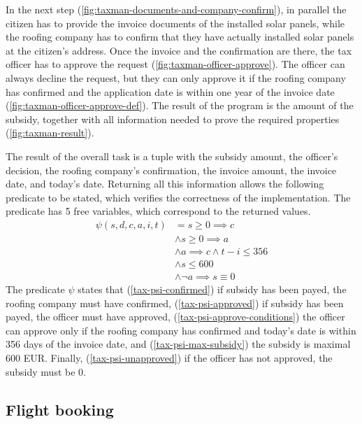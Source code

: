 In the next step (\cref{fig:taxman-documents-and-company-confirm}), in parallel the citizen has to provide the invoice documents of the installed solar panels, while the roofing company has to confirm that they have actually installed solar panels at the citizen's address.
Once the invoice and the confirmation are there, the tax officer has to approve the request (\cref{fig:taxman-officer-approve}).
The officer can always decline the request, but they can only approve it if the roofing company has confirmed and the application date is within one year of the invoice date (\cref{fig:taxman-officer-approve-def}).
The result of the program is the amount of the subsidy, together with all information needed to prove the required properties (\cref{fig:taxman-result}).

The result of the overall task is a tuple with the subsidy amount, the officer's decision, the roofing company's confirmation, the invoice amount, the invoice date, and today's date.
Returning all this information allows the following predicate to be stated, which verifies the correctness of the implementation.
The predicate has 5 free variables, which correspond to the returned values.
\setcounter{equation}{0}
\begin{align}
\psi(s,d,c,a,i,t)
   & =      s \geq 0 \implies c \label{tax-psi-confirmed}
\\ & \wedge s \geq 0 \implies a \label{tax-psi-approved}
\\ & \wedge a \implies c \wedge t - i \leq 356 \label{tax-psi-approve-conditions}
\\ & \wedge s \leq 600 \label{tax-psi-max-subsidy}
\\ & \wedge \lnot a \implies s \equiv 0 \label{tax-psi-unapproved}
\end{align}
The predicate $\psi$ states that (\ref{tax-psi-confirmed}) if subsidy has been payed, the roofing company must have confirmed, (\ref{tax-psi-approved}) if subsidy has been payed, the officer must have approved, (\ref{tax-psi-approve-conditions}) the officer can approve only if the roofing company has confirmed and today's date is within 356 days of the invoice date, and (\ref{tax-psi-max-subsidy}) the subsidy is maximal 600 EUR.
Finally, (\ref{tax-psi-unapproved}) if the officer has not approved, the subsidy must be 0.



\subsection{Flight booking}

